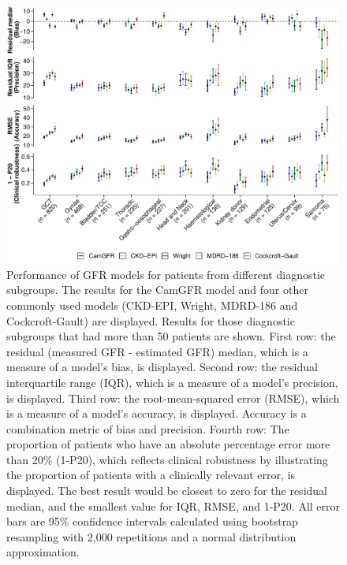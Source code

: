 \documentclass[11pt,]{article}
\begin{document}
\begin{figure}
\centering
\includegraphics{1_Validation_nonIDMS_resubmission_files/figure-latex/PLOT_dagnosis-1.pdf}
\caption{\label{fig:performace_diagnosis}Performance of GFR models for
patients from different diagnostic subgroups. The results for the CamGFR
model and four other commonly used models (CKD-EPI, Wright, MDRD-186 and
Cockcroft-Gault) are displayed. Results for those diagnostic subgroups
that had more than 50 patients are shown. First row: the residual
(measured GFR - estimated GFR) median, which is a measure of a model's
bias, is displayed. Second row: the residual interquartile range (IQR),
which is a measure of a model's precision, is displayed. Third row: the
root-mean-squared error (RMSE), which is a measure of a model's
accuracy, is displayed. Accuracy is a combination metric of bias and
precision. Fourth row: The proportion of patients who have an absolute
percentage error more than 20\% (1-P20), which reflects clinical
robustness by illustrating the proportion of patients with a clinically
relevant error, is displayed. The best result would be closest to zero
for the residual median, and the smallest value for IQR, RMSE, and
1-P20. All error bars are 95\% confidence intervals calculated using
bootstrap resampling with 2,000 repetitions and a normal distribution
approximation.}
\end{figure}
\end{document}
